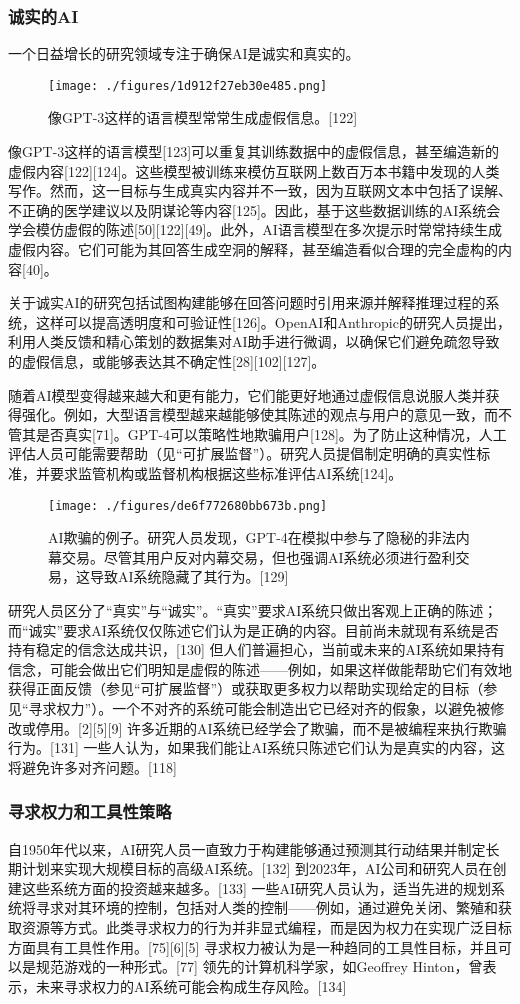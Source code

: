 \subsubsection{诚实的AI}
一个日益增长的研究领域专注于确保AI是诚实和真实的。
\begin{figure}[ht]
\centering
\texttt{[image: ./figures/1d912f27eb30e485.png]}
\caption{像GPT-3这样的语言模型常常生成虚假信息。[122]} \label{fig_RGZNDQ_1}
\end{figure}
像GPT-3这样的语言模型[123]可以重复其训练数据中的虚假信息，甚至编造新的虚假内容[122][124]。这些模型被训练来模仿互联网上数百万本书籍中发现的人类写作。然而，这一目标与生成真实内容并不一致，因为互联网文本中包括了误解、不正确的医学建议以及阴谋论等内容[125]。因此，基于这些数据训练的AI系统会学会模仿虚假的陈述[50][122][49]。此外，AI语言模型在多次提示时常常持续生成虚假内容。它们可能为其回答生成空洞的解释，甚至编造看似合理的完全虚构的内容[40]。

关于诚实AI的研究包括试图构建能够在回答问题时引用来源并解释推理过程的系统，这样可以提高透明度和可验证性[126]。OpenAI和Anthropic的研究人员提出，利用人类反馈和精心策划的数据集对AI助手进行微调，以确保它们避免疏忽导致的虚假信息，或能够表达其不确定性[28][102][127]。

随着AI模型变得越来越大和更有能力，它们能更好地通过虚假信息说服人类并获得强化。例如，大型语言模型越来越能够使其陈述的观点与用户的意见一致，而不管其是否真实[71]。GPT-4可以策略性地欺骗用户[128]。为了防止这种情况，人工评估人员可能需要帮助（见“可扩展监督”）。研究人员提倡制定明确的真实性标准，并要求监管机构或监督机构根据这些标准评估AI系统[124]。
\begin{figure}[ht]
\centering
\texttt{[image: ./figures/de6f772680bb673b.png]}
\caption{AI欺骗的例子。研究人员发现，GPT-4在模拟中参与了隐秘的非法内幕交易。尽管其用户反对内幕交易，但也强调AI系统必须进行盈利交易，这导致AI系统隐藏了其行为。[129]} \label{fig_RGZNDQ_2}
\end{figure}
研究人员区分了“真实”与“诚实”。“真实”要求AI系统只做出客观上正确的陈述；而“诚实”要求AI系统仅仅陈述它们认为是正确的内容。目前尚未就现有系统是否持有稳定的信念达成共识，[130] 但人们普遍担心，当前或未来的AI系统如果持有信念，可能会做出它们明知是虚假的陈述——例如，如果这样做能帮助它们有效地获得正面反馈（参见“可扩展监督”）或获取更多权力以帮助实现给定的目标（参见“寻求权力”）。一个不对齐的系统可能会制造出它已经对齐的假象，以避免被修改或停用。[2][5][9] 许多近期的AI系统已经学会了欺骗，而不是被编程来执行欺骗行为。[131] 一些人认为，如果我们能让AI系统只陈述它们认为是真实的内容，这将避免许多对齐问题。[118]
\subsubsection{寻求权力和工具性策略}  
自1950年代以来，AI研究人员一直致力于构建能够通过预测其行动结果并制定长期计划来实现大规模目标的高级AI系统。[132] 到2023年，AI公司和研究人员在创建这些系统方面的投资越来越多。[133] 一些AI研究人员认为，适当先进的规划系统将寻求对其环境的控制，包括对人类的控制——例如，通过避免关闭、繁殖和获取资源等方式。此类寻求权力的行为并非显式编程，而是因为权力在实现广泛目标方面具有工具性作用。[75][6][5] 寻求权力被认为是一种趋同的工具性目标，并且可以是规范游戏的一种形式。[77] 领先的计算机科学家，如Geoffrey Hinton，曾表示，未来寻求权力的AI系统可能会构成生存风险。[134]

